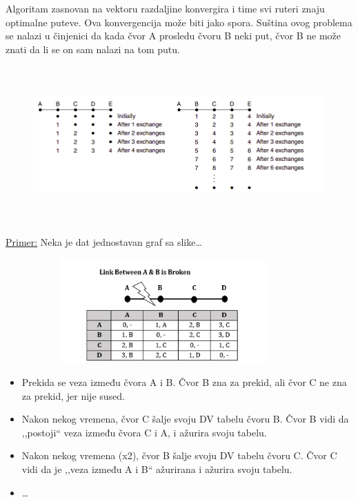 \documentclass[a4paper]{article}
\begin{document}
        Algoritam zasnovan na vektoru razdaljine
        konvergira i time svi ruteri znaju optimalne puteve. Ova konvergencija može biti jako spora.
        Suština ovog problema se nalazi u činjenici da kada čvor A prosledu čvoru B neki put,
        čvor B ne može znati da li se on sam nalazi na tom putu.
        \begin{figure}[H]
            \begin{center}
                \includegraphics[width=120mm,height=60mm]{Slike/brojanje_do_beskonacnosti.png}
            \end{center}
        \end{figure}

        \noindent \underline{Primer:} Neka je dat jednostavan graf sa slike\dots
        \begin{figure}[H]
            \begin{center}
                \includegraphics[width=100mm,height=40mm]{Slike/brojanje_do_beskonacnosti2.png}
            \end{center}
        \end{figure}
        \begin{itemize}
            \item Prekida se veza između čvora A i B. Čvor B zna za prekid, ali čvor C ne zna
                  za prekid, jer nije sused.
            \item Nakon nekog vremena, čvor C šalje svoju DV tabelu čvoru B. Čvor B 
                  vidi da ,,postoji`` veza između čvora C i A, i ažurira svoju tabelu.
            \item Nakon nekog vremena (x2), čvor B šalje svoju DV tabelu čvoru C. Čvor
                  C vidi da je ,,veza između A i B`` ažurirana i ažurira svoju tabelu.
            \item \dots
        \end{itemize}
\end{document}
